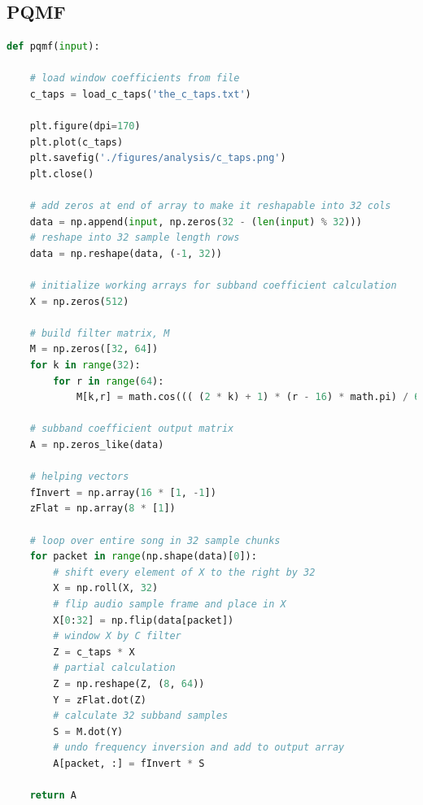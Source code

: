 \documentclass[11pt,a4paper]{article}
\begin{document}
\subsection{PQMF}
\begin{lstlisting}[language=Python]
def pqmf(input):

    # load window coefficients from file
    c_taps = load_c_taps('the_c_taps.txt')

    plt.figure(dpi=170)
    plt.plot(c_taps)
    plt.savefig('./figures/analysis/c_taps.png')
    plt.close()

    # add zeros at end of array to make it reshapable into 32 cols
    data = np.append(input, np.zeros(32 - (len(input) % 32)))
    # reshape into 32 sample length rows
    data = np.reshape(data, (-1, 32))

    # initialize working arrays for subband coefficient calculation
    X = np.zeros(512)

    # build filter matrix, M
    M = np.zeros([32, 64])
    for k in range(32):
        for r in range(64):
            M[k,r] = math.cos((( (2 * k) + 1) * (r - 16) * math.pi) / 64)

    # subband coefficient output matrix
    A = np.zeros_like(data)

    # helping vectors
    fInvert = np.array(16 * [1, -1])
    zFlat = np.array(8 * [1])

    # loop over entire song in 32 sample chunks
    for packet in range(np.shape(data)[0]):
        # shift every element of X to the right by 32
        X = np.roll(X, 32)
        # flip audio sample frame and place in X
        X[0:32] = np.flip(data[packet])
        # window X by C filter
        Z = c_taps * X
        # partial calculation
        Z = np.reshape(Z, (8, 64))
        Y = zFlat.dot(Z)
        # calculate 32 subband samples
        S = M.dot(Y)
        # undo frequency inversion and add to output array
        A[packet, :] = fInvert * S

    return A
\end{lstlisting}

\pagebreak
\end{document}
